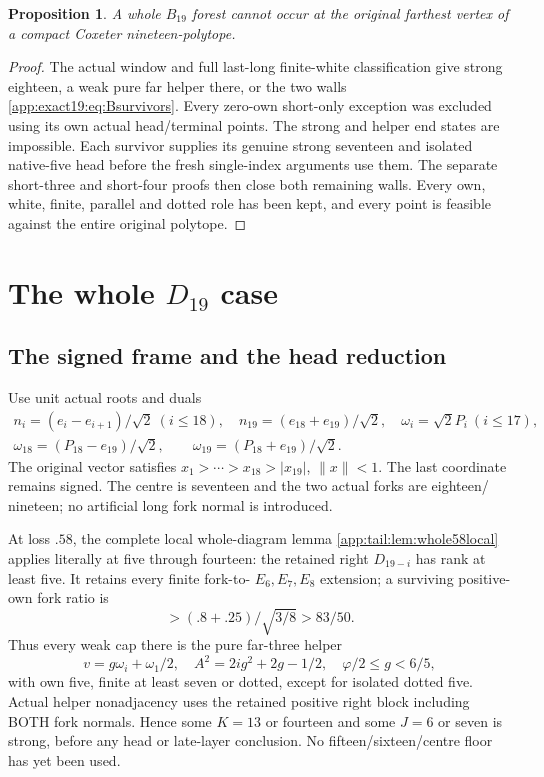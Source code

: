 \documentclass[11pt]{article}
\newtheorem{proposition}[theorem]{Proposition}
\theoremstyle{definition}
\theoremstyle{remark}
\begin{document}
\begin{proposition}\label{app:exact19:prop:wholeB19}
A whole \(B_{19}\) forest cannot
occur at the original farthest
vertex of a compact Coxeter
nineteen-polytope.
\end{proposition}
\begin{proof}
The actual window and full
last-long finite-white classification
give strong eighteen, a weak pure
far helper there, or the two walls
\eqref{app:exact19:eq:Bsurvivors}.
Every zero-own short-only
exception was excluded using its
own actual head/terminal points.
The strong and helper end states
are impossible.
Each survivor supplies its genuine
strong seventeen and isolated
native-five head before the fresh
single-index arguments use them.
The separate short-three and
short-four proofs then close both
remaining walls.
Every own, white, finite, parallel
and dotted role has been kept,
and every point is feasible against
the entire original polytope.
\end{proof}

\section[The whole D19 case]{The whole \(D_{19}\) case}
\label{app:exact19:wholeD19proof}
\subsection{The signed frame and the head reduction}
\label{app:exact19:Dhead}

Use unit actual roots and duals
\[
\begin{gathered}
 n_i=(e_i-e_{i+1})/\sqrt2\ (i\le18),\quad
 n_{19}=(e_{18}+e_{19})/\sqrt2,\quad
 \omega_i=\sqrt2P_i\ (i\le17),\\
 \omega_{18}=(P_{18}-e_{19})/\sqrt2,\qquad
 \omega_{19}=(P_{18}+e_{19})/\sqrt2 .
\end{gathered}
\]
The original vector satisfies
\(x_1>\cdots>x_{18}>|x_{19}|\),
\(\|x\|<1\).
The last coordinate remains signed.
The centre is seventeen and the
two actual forks are eighteen/
nineteen; no artificial long
fork normal is introduced.

At loss \(.58\), the complete local
whole-diagram lemma
\ref{app:tail:lem:whole58local}
applies literally at five through
fourteen: the retained right
\(D_{19-i}\) has rank at least five.
It retains every finite fork-to-
\(E_6,E_7,E_8\) extension;
a surviving positive-own fork
ratio is
\[
                >(.8+.25)/\sqrt{3/8}>83/50 .
\]
Thus every weak cap there is the
pure far-three helper
\[
        v=g\omega_i+\omega_1/2,\quad
        A^2=2ig^2+2g-1/2,\quad
        \varphi/2\le g<6/5 ,
\]
with own five, finite at least
seven or dotted, except for
isolated dotted five.
Actual helper nonadjacency uses
the retained positive right block
including BOTH fork normals.
Hence some \(K=13\) or fourteen
and some \(J=6\) or seven is strong,
before any head or late-layer
conclusion.
No fifteen/sixteen/centre floor
has yet been used.
\end{document}
